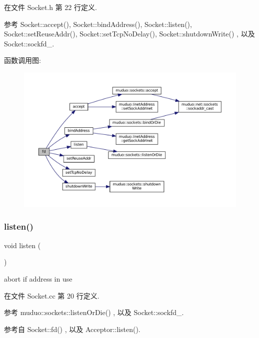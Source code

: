 在文件 Socket.\+h 第 22 行定义.



参考 Socket\+::accept(), Socket\+::bind\+Address(), Socket\+::listen(), Socket\+::set\+Reuse\+Addr(), Socket\+::set\+Tcp\+No\+Delay(), Socket\+::shutdown\+Write() , 以及 Socket\+::sockfd\+\_\+.

函数调用图\+:
\nopagebreak
\begin{figure}[H]
\begin{center}
\leavevmode
\includegraphics[width=350pt]{classmuduo_1_1Socket_ace5c4071ee8893901bb818bbcab739b2_cgraph}
\end{center}
\end{figure}
\mbox{\label{classmuduo_1_1Socket_a458bbe4cf81360301586b2e62a7f9dd2}} 
\subsubsection{\texorpdfstring{listen()}{listen()}}
{\footnotesize\ttfamily void listen (\begin{DoxyParamCaption}{ }\end{DoxyParamCaption})}



abort if address in use 



在文件 Socket.\+cc 第 20 行定义.



参考 muduo\+::sockets\+::listen\+Or\+Die() , 以及 Socket\+::sockfd\+\_\+.



参考自 Socket\+::fd() , 以及 Acceptor\+::listen().

